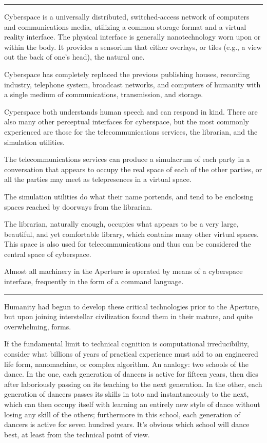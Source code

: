 \documentclass[english,11pt,letterpaper,onecolumn]{scrbook}
\begin{document}
\begin{center}\rule[3pt]{2in}{0.5pt}\end{center}

	Cyberspace is a universally distributed, switched-access network of computers and communications media, utilizing a common storage format and a virtual reality interface.  The physical interface is generally nanotechnology worn upon or within the body.  It provides a sensorium that either overlays, or tiles (e.g., a view out the back of one's head), the natural one.

 	Cyberspace has completely replaced the previous publishing houses, recording industry, telephone system, broadcast networks, and computers of humanity with a single medium of communications, transmission, and storage.

	Cyperspace both understands human speech and can respond in kind.  There are also many other perceptual interfaces for cyberspace, but the most commonly experienced are those for the telecommunications services, the librarian, and the simulation utilities.  

	The telecommunications services can produce a simulacrum of each party in a conversation that appears to occupy the real space of each of the other parties, or all the parties may meet as telepresences in a virtual space.

	The simulation utilities do what their name portends, and tend to be enclosing spaces reached by doorways from the librarian.

	The librarian, naturally enough, occupies what appears to be a very large, beautiful, and yet comfortable library, which contains many other virtual spaces.  This space is also used for telecommunications and thus can be considered the central space of cyberspace.

	Almost all machinery in the Aperture is operated by means of a cyberspace interface, frequently in the form of a command language.

\begin{center}\rule[3pt]{2in}{0.5pt}\end{center}

	Humanity had begun to develop these critical technologies prior to the Aperture, but upon joining interstellar civilization found them in their mature, and quite overwhelming, forms.  

	If the fundamental limit to technical cognition is computational 
irreducibility, consider what billions of years of practical experience must 
add to an engineered life form, nanomachine, or complex algorithm.  An analogy: 
 two schools of the dance.  In the one, each generation of dancers is active 
for fifteen years, then dies after laboriously passing on its teaching to the 
next generation.  In the other, each generation of dancers passes its skills in 
toto and instantaneously to the next, which can then occupy itself with 
learning an entirely new style of dance without losing any skill of the others; 
furthermore in this school, each generation of dancers is active for seven 
hundred years.  It's obvious which school will dance best, at least from the 
technical point of view.
\end{document}
